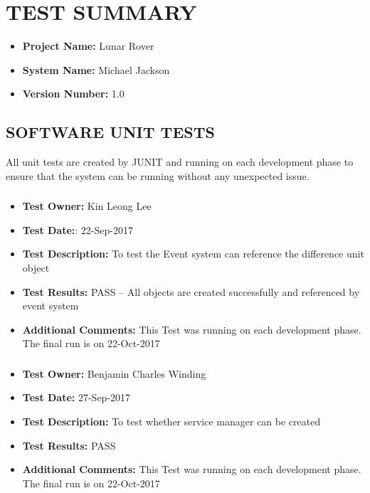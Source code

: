 \documentclass[10pt,a4paper,titlepage]{article}
\begin{document}
	\section{TEST SUMMARY}
\begin{itemize}
\item \textbf{Project Name:}  Lunar Rover
\item \textbf{System Name:} Michael Jackson
\item \textbf{Version Number:} 1.0
\end{itemize}
	\subsection{SOFTWARE UNIT TESTS}
	All unit tests are created by JUNIT and running on each development phase to ensure that the system can be running without any unexpected issue.
\subsubsection*{}
	\begin{itemize}
\item \textbf{Test Owner:}  Kin Leong Lee
\item \textbf{Test Date:}: 22-Sep-2017
\item \textbf{Test Description:} To test the Event system can reference the difference unit object
\item \textbf{Test Results:} PASS – All objects are created successfully and referenced by event system
\item \textbf{Additional Comments:} This Test was running on each development phase. The final run is on 22-Oct-2017
	\end{itemize}
\subsubsection*{}
\begin{itemize}
\item \textbf{Test Owner:} Benjamin Charles Winding
\item \textbf{Test Date:} 27-Sep-2017
\item \textbf{Test Description:} To test whether service manager can be created
\item \textbf{Test Results:} PASS
\item \textbf{Additional Comments:} This Test was running on each development phase. The final run is on 22-Oct-2017
\end{itemize}
\end{document}
